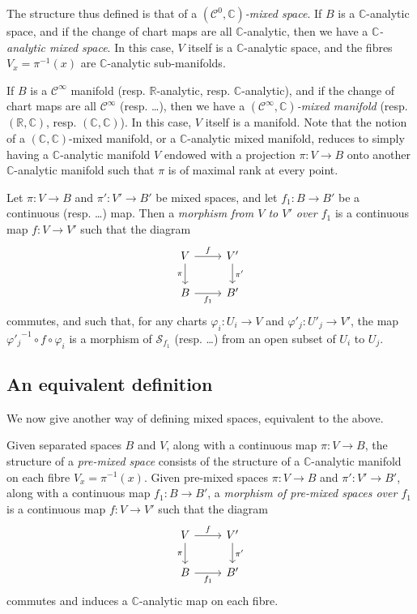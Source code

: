 \documentclass{article}
\newcommand{\RR}{\mathbb{R}}
\newcommand{\CC}{\mathbb{C}}
\newcommand{\oldpage}[1]{\marginpar{\footnotesize$\Big\vert$ \textit{p.~#1}}}
\begin{document}
The structure thus defined is that of a \emph{$(\mathscr{C}^0,\CC)$-mixed space}.
If $B$ is a $\CC$-analytic space, and if the change of chart maps are all $\CC$-analytic, then we have a \emph{$\CC$-analytic mixed space}.
In this case, $V$ itself is a $\CC$-analytic space, and the fibres $V_x=\pi^{-1}(x)$ are $\CC$-analytic sub-manifolds.

If $B$ is a $\mathscr{C}^\infty$ manifold (resp. $\RR$-analytic, resp. $\CC$-analytic), and if the change of chart maps are all $\mathscr{C}^\infty$ (resp. \ldots), then we have a \emph{$(\mathscr{C}^\infty,\CC)$-mixed manifold} (resp. $(\RR,\CC)$, resp. $(\CC,\CC)$).
In this case, $V$ itself is a manifold.
Note that the notion of a $(\CC,\CC)$-mixed manifold, or a $\CC$-analytic mixed manifold, reduces to simply having a $\CC$-analytic manifold $V$ endowed with a projection $\pi\colon V\to B$ onto another $\CC$-analytic manifold such that $\pi$ is of maximal rank at every point.

Let $\pi\colon V\to B$ and $\pi'\colon V'\to B'$ be mixed spaces, and let $f_1\colon B\to B'$ be a continuous (resp. \ldots) map.
Then a \emph{morphism from $V$ to $V'$ over $f_1$} is a continuous map $f\colon V\to V'$ such that the diagram
\[
  \begin{tikzcd}
    V \rar["f"] \dar[swap,"\pi"]
    & V' \dar["\pi'"]
  \\B \rar[swap,"f_1"]
    & B'
  \end{tikzcd}
\]
\oldpage{2-03}
commutes, and such that, for any charts $\varphi_i\colon U_i\to V$ and $\varphi'_j\colon U'_j\to V'$, the map ${\varphi'_j}^{-1}\circ f\circ\varphi_i$ is a morphism of $\mathscr{S}_{f_1}$ (resp. \ldots) from an open subset of $U_i$ to $U_j$.


\subsection{An equivalent definition}
\label{II.2}

We now give another way of defining mixed spaces, equivalent to the above.


Given separated spaces $B$ and $V$, along with a continuous map $\pi\colon V\to B$, the structure of a \emph{pre-mixed space} consists of the structure of a $\CC$-analytic manifold on each fibre $V_x=\pi^{-1}(x)$.
Given pre-mixed spaces $\pi\colon V\to B$ and $\pi'\colon V'\to B'$, along with a continuous map $f_1\colon B\to B'$, a \emph{morphism of pre-mixed spaces over $f_1$} is a continuous map $f\colon V\to V'$ such that the diagram
\[
  \begin{tikzcd}
    V \rar["f"] \dar[swap,"\pi"]
    & V' \dar["\pi'"]
  \\B \rar[swap,"f_1"]
    & B'
  \end{tikzcd}
\]
commutes and induces a $\CC$-analytic map on each fibre.
\end{document}
